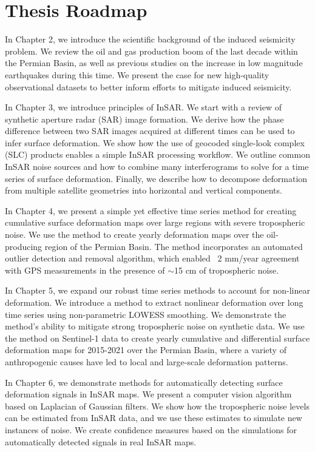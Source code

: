 \documentclass{utexasthesis}
\begin{document}
\section{Thesis Roadmap}
\label{sec:chap1-roadmap}

In Chapter 2, we introduce the scientific background of the induced seismicity problem. We review the oil and gas production boom of the last decade within the Permian Basin, as well as previous studies on the increase in low magnitude earthquakes during this time. We present the case for new high-quality observational datasets to better inform efforts to mitigate induced seismicity.

In Chapter 3, we introduce principles of InSAR. We start with a review of synthetic aperture radar (SAR) image formation. We derive how the phase difference between two SAR images acquired at different times can be used to infer surface deformation. We show how the use of geocoded single-look complex (SLC) products enables a simple InSAR processing workflow. We outline common InSAR noise sources and how to combine many interferograms to solve for a time series of surface deformation. Finally, we describe how to decompose deformation from multiple satellite geometries into horizontal and vertical components.


In Chapter 4, we present a simple yet effective time series method for creating cumulative surface deformation maps over large regions with severe tropospheric noise. We use the method to create yearly deformation maps over the oil-producing region of the Permian Basin. The method incorporates an automated outlier detection and removal algorithm, which enabled ~2 mm/year agreement with GPS measurements in the presence of $\sim$15 cm of tropospheric noise.


In Chapter 5, we expand our robust time series methods to account for non-linear deformation. We introduce a method to extract nonlinear deformation over long time series using non-parametric LOWESS smoothing. We demonstrate the method's ability to mitigate strong tropospheric noise on synthetic data. We use the method on Sentinel-1 data to create yearly cumulative and differential surface deformation maps for 2015-2021 over the Permian Basin, where a variety of anthropogenic causes have led to local and large-scale deformation patterns.


In Chapter 6, we demonstrate methods for automatically detecting surface deformation signals in InSAR maps. We present a computer vision algorithm based on Laplacian of Gaussian filters. We show how the tropospheric noise levels can be estimated from InSAR data, and we use these estimates to simulate new instances of noise. We create confidence measures based on the simulations for automatically detected signals in real InSAR maps.
\end{document}
